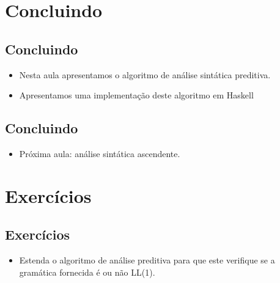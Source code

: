 \documentclass[11pt]{article}
\begin{document}
\section*{Concluindo}
\label{sec:org252ca2e}

\subsection*{Concluindo}
\label{sec:orga92c964}

\begin{itemize}
\item Nesta aula apresentamos o algoritmo de análise sintática preditiva.

\item Apresentamos uma implementação deste algoritmo em Haskell
\end{itemize}
\subsection*{Concluindo}
\label{sec:org05a5d5d}

\begin{itemize}
\item Próxima aula: análise sintática ascendente.
\end{itemize}
\section*{Exercícios}
\label{sec:orgf258545}

\subsection*{Exercícios}
\label{sec:org13fd151}

\begin{itemize}
\item Estenda o algoritmo de análise preditiva para que este verifique se a
gramática fornecida é ou não LL(1).
\end{itemize}
\end{document}
